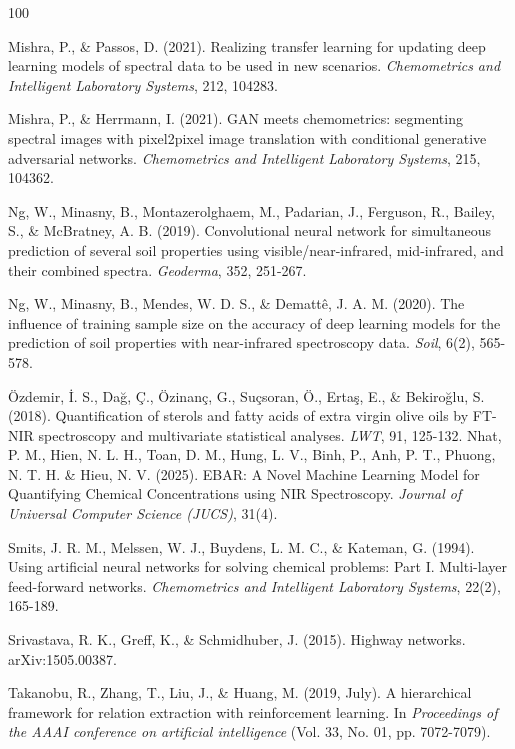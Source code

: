 \documentclass[10pt, a4paper, oneside]{article}
\begin{document}
\begin{thebibliography}{100}
{ Mishra, P., \& Passos, D. (2021). Realizing transfer learning for updating deep learning models of spectral data to be used in new scenarios. \textit{Chemometrics and Intelligent Laboratory Systems}, 212, 104283.

 Mishra, P., \& Herrmann, I. (2021). GAN meets chemometrics: segmenting spectral images with pixel2pixel image translation with conditional generative adversarial networks. \textit{Chemometrics and Intelligent Laboratory Systems}, 215, 104362.

 Ng, W., Minasny, B., Montazerolghaem, M., Padarian, J., Ferguson, R., Bailey, S., \& McBratney, A. B. (2019). Convolutional neural network for simultaneous prediction of several soil properties using visible/near-infrared, mid-infrared, and their combined spectra. \textit{Geoderma}, 352, 251-267.

 Ng, W., Minasny, B., Mendes, W. D. S., \& Demattê, J. A. M. (2020). The influence of training sample size on the accuracy of deep learning models for the prediction of soil properties with near-infrared spectroscopy data. \textit{Soil}, 6(2), 565-578.

 Özdemir, İ. S., Dağ, Ç., Özinanç, G., Suçsoran, Ö., Ertaş, E., \& Bekiroğlu, S. (2018). Quantification of sterols and fatty acids of extra virgin olive oils by FT-NIR spectroscopy and multivariate statistical analyses. \textit{LWT}, 91, 125-132.
 Nhat, P. M., Hien, N. L. H., Toan, D. M., Hung, L. V., Binh, P., Anh, P. T., Phuong, N. T. H. \& Hieu, N. V. (2025). EBAR: A Novel Machine Learning Model for Quantifying Chemical Concentrations using NIR Spectroscopy. \textit{Journal of Universal Computer Science (JUCS)}, 31(4).

 Smits, J. R. M., Melssen, W. J., Buydens, L. M. C., \& Kateman, G. (1994). Using artificial neural networks for solving chemical problems: Part I. Multi-layer feed-forward networks. \textit{Chemometrics and Intelligent Laboratory Systems}, 22(2), 165-189.

 Srivastava, R. K., Greff, K., \& Schmidhuber, J. (2015). Highway networks. arXiv:1505.00387.

 Takanobu, R., Zhang, T., Liu, J., \& Huang, M. (2019, July). A hierarchical framework for relation extraction with reinforcement learning. In \textit{Proceedings of the AAAI conference on artificial intelligence} (Vol. 33, No. 01, pp. 7072-7079).

}
\end{thebibliography}
\end{document}
